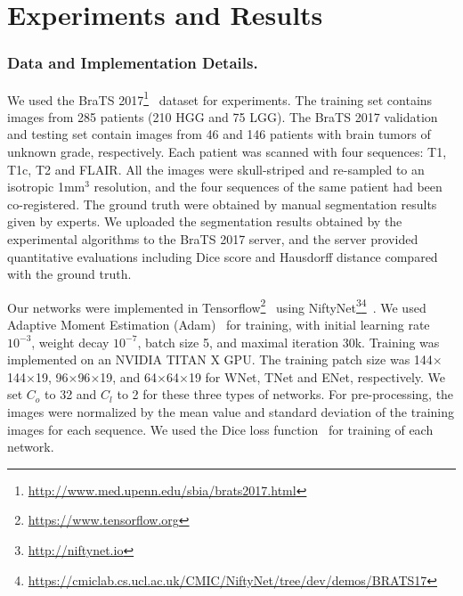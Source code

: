 \documentclass[a4paper,orivec,runningheads]{llncs}
\begin{document}
\section{Experiments and Results}

\subsubsection{Data and Implementation Details.}

We used the BraTS 2017\footnote{\url{http://www.med.upenn.edu/sbia/brats2017.html}}~\cite{Menze2015,Bakas2017,Bakas2017a,Bakas2017b} dataset for experiments. The training set contains images from 285 patients (210 HGG and 75 LGG). The BraTS 2017 validation and testing set contain images from 46 and 146 patients with brain tumors of unknown grade, respectively. Each patient was scanned with four sequences: T1, T1c, T2 and FLAIR. All the images were skull-striped and re-sampled to an isotropic 1mm$^3$ resolution, and the four sequences of the same patient had been co-registered. The ground truth were obtained by manual segmentation results given by experts. We uploaded the segmentation results obtained by the experimental algorithms to the BraTS 2017 server, and the server provided quantitative evaluations including Dice score and Hausdorff distance compared with the ground truth.

Our networks were implemented in Tensorflow\footnote{\url{https://www.tensorflow.org}}~\cite{Abadi2016} using NiftyNet\footnote{\url{http://niftynet.io}}\footnote{\url{https://cmiclab.cs.ucl.ac.uk/CMIC/NiftyNet/tree/dev/demos/BRATS17}}~\cite{Gibson2017a}. We used Adaptive Moment Estimation (Adam)~\cite{Kingma2015} for training, with initial learning rate $10^{-3}$, weight decay $10^{-7}$, batch size 5, and maximal iteration 30k. Training was implemented on
an NVIDIA TITAN X GPU. The training patch size was 144$\times$144$\times$19, 96$\times$96$\times$19, and 64$\times$64$\times$19 for WNet, TNet and ENet, respectively. We set $C_o$ to 32 and $C_l$ to 2 for these three types of networks.  For pre-processing, the images were normalized by the mean value and standard deviation of the training images for each sequence. We used the Dice loss function~\cite{Milletari2016,Fidon2017b} for training of each network.
 
\end{document}
